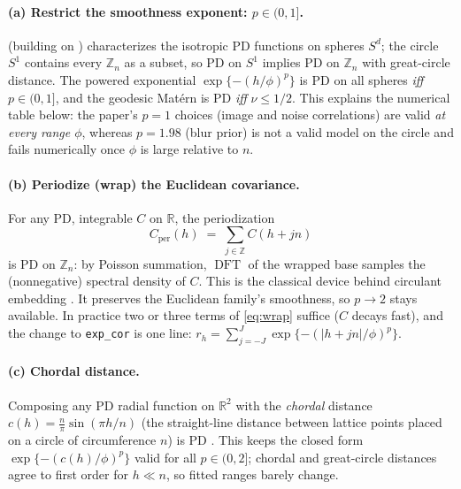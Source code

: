 \documentclass[11pt]{article}
\newcommand{\Z}{\mathbb{Z}}
\newcommand{\R}{\mathbb{R}}
\newcommand{\dft}{\operatorname{DFT}}
\begin{document}
\paragraph{(a) Restrict the smoothness exponent: $p \in (0, 1]$.}
\citet{Gneiting2013} (building on \citealp{Schoenberg1942}) characterizes the
isotropic PD functions on spheres $S^d$; the circle $S^1$ contains every
$\Z_n$ as a subset, so PD on $S^1$ implies PD on $\Z_n$ with great-circle
distance. The powered exponential $\exp\{-(h/\phi)^p\}$ is PD on all spheres
\emph{iff} $p \in (0, 1]$, and the geodesic Mat\'ern is PD \emph{iff}
$\nu \le 1/2$. This explains the numerical table below: the paper's $p=1$
choices (image and noise correlations) are valid \emph{at every range
$\phi$}, whereas $p = 1.98$ (blur prior) is not a valid model on the circle
and fails numerically once $\phi$ is large relative to $n$.

\paragraph{(b) Periodize (wrap) the Euclidean covariance.}
For any PD, integrable $C$ on $\R$, the periodization
\begin{equation} \label{eq:wrap}
  C_{\mathrm{per}}(h) \;=\; \sum_{j \in \Z} C(h + jn)
\end{equation}
is PD on $\Z_n$: by Poisson summation, $\dft$ of the wrapped base samples the
(nonnegative) spectral density of $C$. This is the classical device behind
circulant embedding \citep{WoodChan1994, DietrichNewsam1997, Stein1999}. It
preserves the Euclidean family's smoothness, so $p \to 2$ stays available. In
practice two or three terms of \eqref{eq:wrap} suffice ($C$ decays fast), and
the change to \texttt{exp\_cor} is one line:
$r_h = \sum_{j=-J}^{J} \exp\{-(|h + jn|/\phi)^p\}$.

\paragraph{(c) Chordal distance.}
Composing any PD radial function on $\R^2$ with the \emph{chordal} distance
$c(h) = \frac{n}{\pi}\sin(\pi h / n)$ (the straight-line distance between
lattice points placed on a circle of circumference $n$) is PD
\citep{Yadrenko1983, Gneiting2013}. This keeps the closed form
$\exp\{-(c(h)/\phi)^p\}$ valid for all $p \in (0,2]$; chordal and great-circle
distances agree to first order for $h \ll n$, so fitted ranges barely change.
\end{document}
